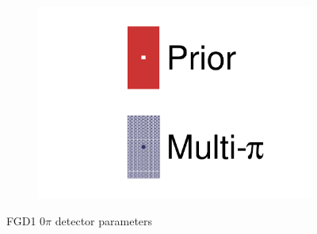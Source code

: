 \begin{figure}[h]
\begin{subfigure}[t]{0.32\textwidth}
		\includegraphics[width=\textwidth,page=27, trim={0mm 0mm 0mm 0mm}, clip]{figures/mach3/2018/data/2018a_FixedCov_RedCov_Mpi_Data_merge_drawPar_withDet}
	\end{subfigure}
	\caption{FGD1 0$\pi$ detector parameters}
	\label{fig:data_multipi_det_fdg1_cc0pi}
\end{figure}

